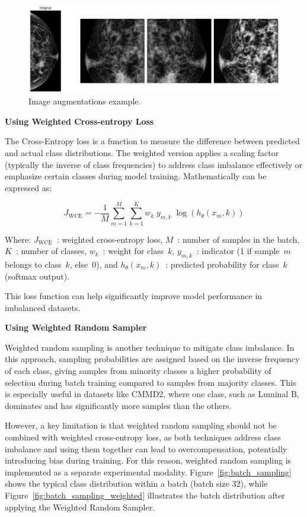 \documentclass[a4paper,10pt]{book}
\begin{document}
\begin{figure}[h!]
    \centering
    \includegraphics[width=0.8\linewidth]{reports//assets/augmentations.png}
    \caption[Image augmentations]{Image augmentations example.}
    \label{fig:augmentations}
\end{figure}


\textbf{Using Weighted Cross-entropy Loss}

The Cross-Entropy loss is a function to measure the difference between predicted and actual class distributions. The weighted version applies  a scaling factor (typically the inverse  of class frequencies) to address class imbalance effectively or emphasize certain classes during model training. Mathematically can be expressed as:

\begin{equation}
J_{\text{WCE}} = -\frac{1}{M} \sum_{m=1}^{M} \sum_{k=1}^{K} w_k \; y_{m,k} \; \log\left( h_\theta(x_m, k) \right)
\end{equation}

Where: $J_{\text{WCE}}$~: weighted cross-entropy loss, $M$~: number of samples in the batch, $K$~: number of classes, $w_k$~: weight for class~$k$, $y_{m,k}$~: indicator (1 if sample~$m$ belongs to class~$k$, else~0), and $h_\theta(x_m, k)$~: predicted probability for class~$k$ (softmax output).

This loss function can help significantly improve model performance in imbalanced datasets.

\textbf{Using Weighted Random Sampler}

Weighted random sampling is another technique to mitigate class imbalance. In this approach, sampling probabilities are assigned based on the inverse frequency of each class, giving samples from minority classes a higher probability of selection during batch training compared to samples from majority classes. This is especially useful in datasets like CMMD2, where one class, such as Luminal B, dominates and has significantly more samples than the others.

However, a key limitation is that weighted random sampling should not be combined with weighted cross-entropy loss, as both techniques address class imbalance and using them together can lead to overcompensation, potentially introducing bias during training. For this reason, weighted random sampling is implemented as a separate experimental modality. Figure~\ref{fig:batch_sampling} shows the typical class distribution within a batch (batch size 32), while Figure~\ref{fig:batch_sampling_weighted} illustrates the batch distribution after applying the Weighted Random Sampler.
\end{document}
